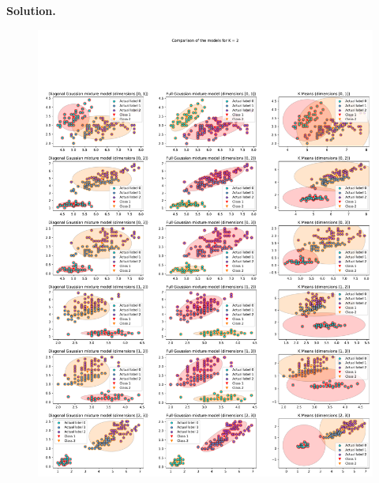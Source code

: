 \documentclass[a4paper, 11pt]{report}
\begin{document}
\begin{enumerate}
        \textbf{Solution.}\\
        \begin{figure}
            \centering
            \includegraphics[width=1\textwidth]{probabilistic_graphical_models/HW2/images/iris_GM_KM_2.pdf}
            \caption{}
            \label{fig:iris2}
        \end{figure}
        

\end{enumerate}
\end{document}
